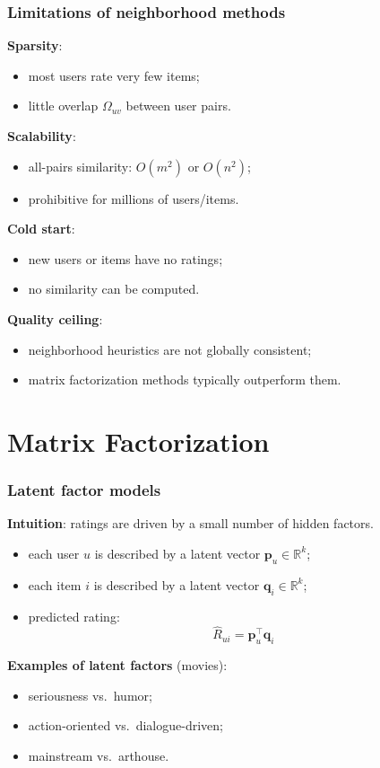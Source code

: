 \documentclass[]{beamer}
\begin{document}
\begin{frame}[fragile]
\frametitle{Limitations of neighborhood methods}
\textbf{Sparsity}:
\begin{itemize}
  \item most users rate very few items;
  \item little overlap $\Omega_{uv}$ between user pairs.
\end{itemize}

\textbf{Scalability}:
\begin{itemize}
  \item all-pairs similarity: $O(m^2)$ or $O(n^2)$;
  \item prohibitive for millions of users/items.
\end{itemize}

\textbf{Cold start}:
\begin{itemize}
  \item new users or items have no ratings;
  \item no similarity can be computed.
\end{itemize}

\textbf{Quality ceiling}:
\begin{itemize}
  \item neighborhood heuristics are not globally consistent;
  \item matrix factorization methods typically outperform them.
\end{itemize}

\end{frame}

\section{Matrix Factorization}

\begin{frame}[fragile]
\frametitle{Latent factor models}
\textbf{Intuition}: ratings are driven by a small number of hidden factors.

\begin{itemize}
  \item each user $u$ is described by a latent vector $\mathbf{p}_u \in \mathbb{R}^k$;
  \item each item $i$ is described by a latent vector $\mathbf{q}_i \in \mathbb{R}^k$;
  \item predicted rating:
\begin{equation*}
\hat{R}_{ui} = \mathbf{p}_u^\top \mathbf{q}_i
\end{equation*}

\end{itemize}
\textbf{Examples of latent factors} (movies):
\begin{itemize}
  \item seriousness vs.\ humor;
  \item action-oriented vs.\ dialogue-driven;
  \item mainstream vs.\ arthouse.
\end{itemize}

\end{frame}
\end{document}
